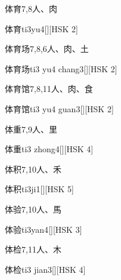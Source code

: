 \begin{entry}{体育}{7,8}{⼈、⾁}
  \begin{phonetics}{体育}{ti3yu4}[][HSK 2]
  \end{phonetics}
\end{entry}

\begin{entry}{体育场}{7,8,6}{⼈、⾁、⼟}
  \begin{phonetics}{体育场}{ti3 yu4 chang3}[][HSK 2]
  \end{phonetics}
\end{entry}

\begin{entry}{体育馆}{7,8,11}{⼈、⾁、⾷}
  \begin{phonetics}{体育馆}{ti3 yu4 guan3}[][HSK 2]
  \end{phonetics}
\end{entry}

\begin{entry}{体重}{7,9}{⼈、⾥}
  \begin{phonetics}{体重}{ti3 zhong4}[][HSK 4]
  \end{phonetics}
\end{entry}

\begin{entry}{体积}{7,10}{⼈、⽲}
  \begin{phonetics}{体积}{ti3ji1}[][HSK 5]
  \end{phonetics}
\end{entry}

\begin{entry}{体验}{7,10}{⼈、⾺}
  \begin{phonetics}{体验}{ti3yan4}[][HSK 3]
  \end{phonetics}
\end{entry}

\begin{entry}{体检}{7,11}{⼈、⽊}
  \begin{phonetics}{体检}{ti3 jian3}[][HSK 4]
  \end{phonetics}
\end{entry}

